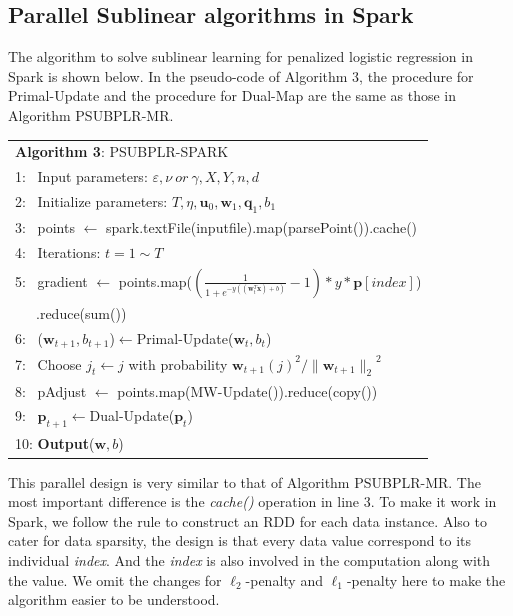 \documentclass[10pt, conference, compsocconf]{IEEEtran}
\newcommand{\bw}{\mathbf{w}}
\newcommand{\bp}{\mathbf{p}}
\newcommand{\bq}{\mathbf{q}}
\newcommand{\lc}{\left(}
\newcommand{\rc}{\right)}
\newcommand{\lj}{\lc j\rc}
\newcommand{\tspace}{\hspace*{2em}}
\begin{document}
\subsection{Parallel Sublinear algorithms in Spark}
The algorithm to solve sublinear learning for penalized logistic regression in Spark is shown below.
In the pseudo-code of Algorithm 3, the procedure for Primal-Update and the procedure for Dual-Map are the same as those in Algorithm PSUBPLR-MR.
    \begin{table}[ht]
	\begin{tabular}{l}
    \hline\noalign{\smallskip}
	\textbf{Algorithm 3}: PSUBPLR-SPARK \\
	\noalign{\smallskip}
	\hline
	\noalign{\smallskip}
    1:  ~Input parameters: $\varepsilon, \nu~or~\gamma, X, Y, n, d$ \\
    2:	~Initialize parameters: $T, \eta, {\mathbf{u}}_{0}, {\bw}_{1}, {\mathbf{\bq}}_{1}, {b}_{1}$\\
    3:  ~points $\leftarrow$ spark.textFile(inputfile).map(parsePoint()).cache() \\
    4:  ~Iterations: $t=1 \sim T$ \\
    5:  ~\tspace gradient $\leftarrow$ points.map($(\frac{1}{1+e^{-y((\bw_t^T \textbf{x})+b)}}-1) * y * \bp [index]$) \\
        ~~~\tspace\tspace\tspace\tspace\tspace .reduce(sum()) \\
    6:  ~\tspace ($\bw_{t+1}, b_{t+1}$)$\leftarrow$Primal-Update($\bw_t, b_t$) \\
    7:  ~\tspace Choose $j_t \leftarrow j$ with probability ${{\bw}_{t+1}\lj}^{2}/{\|{\bw}_{t+1}\|_2}^{2} $ \\
    8:  ~\tspace pAdjust $\leftarrow$ points.map(MW-Update()).reduce(copy()) \\
    9:  ~\tspace $\bp_{t+1}$$\leftarrow$Dual-Update($\bp_t$)  \\
    10: \textbf{Output}($\bw, b$) \\
    \hline
    \end{tabular}
	\end{table}

This parallel design is very similar to that of Algorithm PSUBPLR-MR.
The most important difference is the \textit{cache()} operation in line 3.
To make it work in Spark, we follow the rule to construct an RDD for each data instance.
Also to cater for data sparsity, the design is that every data value correspond to its individual \textit{index}. And the \textit{index} is also involved in the computation along with the value.
We omit the changes for $\ell_2$-penalty and $\ell_1$-penalty here to make the algorithm easier to be understood.
\end{document}
